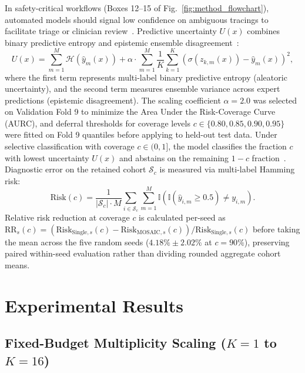 \documentclass{ICIC2026}
\begin{document}
In safety-critical workflows (Boxes 12--15 of Fig.~\ref{fig:method_flowchart}), automated models should signal low confidence on ambiguous tracings to facilitate triage or clinician review~\cite{kompa2024second}. Predictive uncertainty $U(x)$ combines binary predictive entropy and epistemic ensemble disagreement~\cite{lakshminarayanan2017simple}:
\begin{equation}
U(x) = \sum_{m=1}^M \mathcal{H}(\hat{y}_m(x)) + \alpha \cdot \sum_{m=1}^M \frac{1}{K}\sum_{k=1}^K (\sigma(z_{k, m}(x)) - \hat{y}_m(x))^2,
\label{eq:uncertainty}
\end{equation}
where the first term represents multi-label binary predictive entropy (aleatoric uncertainty), and the second term measures ensemble variance across expert predictions (epistemic disagreement). The scaling coefficient $\alpha = 2.0$ was selected on Validation Fold 9 to minimize the Area Under the Risk-Coverage Curve (AURC), and deferral thresholds for coverage levels $c \in \{0.80, 0.85, 0.90, 0.95\}$ were fitted on Fold 9 quantiles before applying to held-out test data.
Under selective classification with coverage $c \in (0, 1]$, the model classifies the fraction $c$ with lowest uncertainty $U(x)$ and abstains on the remaining $1-c$ fraction~\cite{geifman2019selectivenet}. Diagnostic error on the retained cohort $\mathcal{S}_c$ is measured via multi-label Hamming risk:
\begin{equation}
\text{Risk}(c) = \frac{1}{|\mathcal{S}_c| \cdot M} \sum_{i \in \mathcal{S}_c} \sum_{m=1}^M \mathbb{I}\left(\mathbb{I}(\hat{y}_{i, m} \ge 0.5) \ne y_{i, m}\right).
\label{eq:selective_risk}
\end{equation}
Relative risk reduction at coverage $c$ is calculated per-seed as $\text{RR}_s(c) = (\text{Risk}_{\text{Single}, s}(c) - \text{Risk}_{\text{MOSAIC}, s}(c)) / \text{Risk}_{\text{Single}, s}(c)$ before taking the mean across the five random seeds ($4.18\% \pm 2.02\%$ at $c=90\%$), preserving paired within-seed evaluation rather than dividing rounded aggregate cohort means.

\section{Experimental Results}
\label{sec:results}

\subsection{Fixed-Budget Multiplicity Scaling ($K=1$ to $K=16$)}
\label{subsec:res_scaling}
\end{document}
